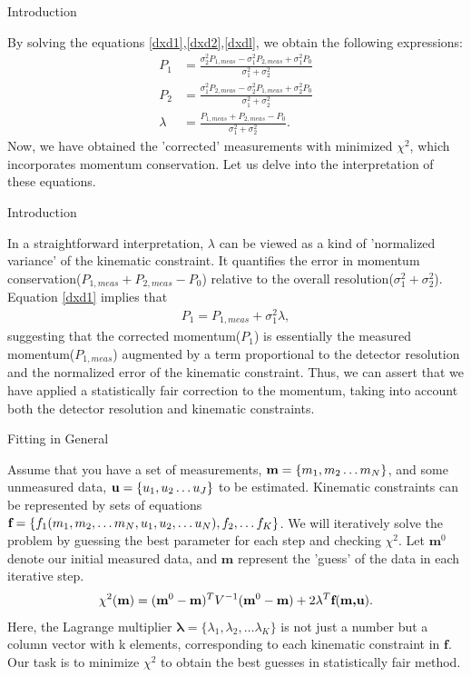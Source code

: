 \documentclass[
	xcolor=dvipsnames,
	10pt, 
	]{beamer}
\begin{document}
\begin{frame}{Introduction}
	\begin{block}{}
		By solving the equations \ref{dxd1},\ref{dxd2},\ref{dxdl}, we obtain the following expressions:
		\begin{align}
			P_1& =\frac{\sigma_2^2 P_{1,meas}-\sigma_1^2P_{2,meas}+\sigma_1^2P_0}{\sigma_1^2+\sigma_2^2}\\
			P_2& = \frac{\sigma_1^2 P_{2,meas}-\sigma_2^2P_{1,meas}+\sigma_2^2P_0}{\sigma_1^2+\sigma_2^2}\\
			\lambda&=\frac{P_{1,meas}+P_{2,meas}-P_0}{\sigma_1^2+\sigma_2^2}.
		\end{align}
			Now, we have obtained the 'corrected' measurements with minimized $\chi^2$, which incorporates momentum conservation.
			Let us delve into the interpretation of these equations.
	\end{block}
\end{frame}
\begin{frame}{Introduction}
	\begin{block}{}
			 In a straightforward interpretation, $\lambda$ can be viewed as a kind of 'normalized variance' of the kinematic constraint. It quantifies the error in momentum conservation($P_{1,meas}+P_{2,meas}-P_0$) relative to the overall resolution($\sigma_1^2+\sigma_2^2$).  Equation \eqref{dxd1} implies that 
\begin{align}
	P_{1}=P_{1,meas}+\sigma_1^2\lambda,
\end{align}
			suggesting that the corrected momentum($P_1$) is essentially the measured momentum($P_{1,meas}$) augmented by a term proportional to the detector resolution and the normalized error of the kinematic constraint. Thus, we can assert that we have applied a statistically fair correction to the momentum, taking into account both the detector resolution and kinematic constraints.
	\end{block}
\end{frame}
\begin{frame}{Fitting in General}
	\begin{block}{}
		Assume that you have a set of measurements, $\textbf m =\{m_1,m_2\ldots m_N\}$, and some unmeasured data, $\textbf u =\{u_1,u_2\ldots u_J\}$ to be estimated. Kinematic constraints can be represented by sets of equations $\textbf f =\{f_1(m_1,m_2,\ldots m_N,u_1,u_2,\ldots u_N),f_2,\ldots f_K\}$. We will iteratively solve the problem by guessing the best parameter for each step and checking  $\chi^2$.  Let $\mathbf m^0$ denote our initial measured data, and $\mathbf m$ represent the 'guess' of the data in each iterative step.
		\begin{align}
			\chi^2(\textbf{m}) = (\textbf{m}^0-\textbf{m})^T V^{-1}(\textbf{m}^0-\textbf{m})+2\mathbf\lambda^T \textbf f(\textbf{m,u}).\label{KFChi2}
		\end{align}
		Here, the Lagrange multiplier $\mathbf \lambda =\{\lambda_1,\lambda_2,\ldots\lambda_K\}$ is not just a number but a column vector with k elements, corresponding to each kinematic constraint in $\mathbf f$. Our task is to minimize $\chi^2$ to obtain the best guesses in statistically fair method.	
	\end{block}
\end{frame}
\end{document}
